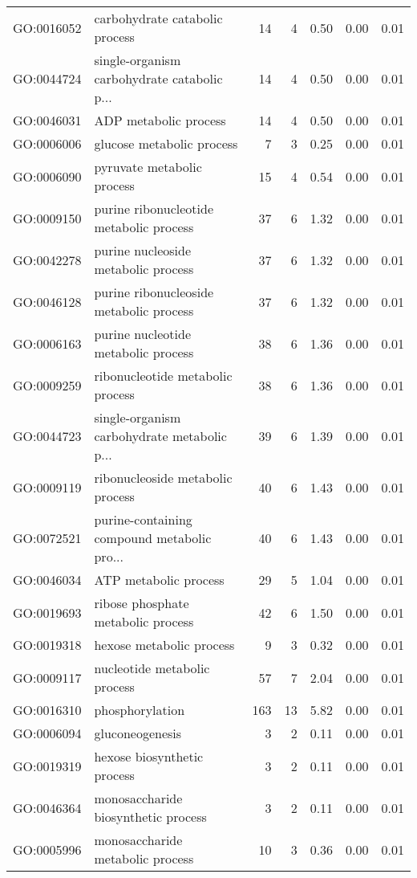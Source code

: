 \begin{table}[ht]
\begin{tabular}{llrrrrr}
  GO:0016052 & carbohydrate catabolic process &  14 &   4 & 0.50 & 0.00 & 0.01 \\ 
  GO:0044724 & single-organism carbohydrate catabolic p... &  14 &   4 & 0.50 & 0.00 & 0.01 \\ 
  GO:0046031 & ADP metabolic process &  14 &   4 & 0.50 & 0.00 & 0.01 \\ 
  GO:0006006 & glucose metabolic process &   7 &   3 & 0.25 & 0.00 & 0.01 \\ 
  GO:0006090 & pyruvate metabolic process &  15 &   4 & 0.54 & 0.00 & 0.01 \\ 
  GO:0009150 & purine ribonucleotide metabolic process &  37 &   6 & 1.32 & 0.00 & 0.01 \\ 
  GO:0042278 & purine nucleoside metabolic process &  37 &   6 & 1.32 & 0.00 & 0.01 \\ 
  GO:0046128 & purine ribonucleoside metabolic process &  37 &   6 & 1.32 & 0.00 & 0.01 \\ 
  GO:0006163 & purine nucleotide metabolic process &  38 &   6 & 1.36 & 0.00 & 0.01 \\ 
  GO:0009259 & ribonucleotide metabolic process &  38 &   6 & 1.36 & 0.00 & 0.01 \\ 
  GO:0044723 & single-organism carbohydrate metabolic p... &  39 &   6 & 1.39 & 0.00 & 0.01 \\ 
  GO:0009119 & ribonucleoside metabolic process &  40 &   6 & 1.43 & 0.00 & 0.01 \\ 
  GO:0072521 & purine-containing compound metabolic pro... &  40 &   6 & 1.43 & 0.00 & 0.01 \\ 
  GO:0046034 & ATP metabolic process &  29 &   5 & 1.04 & 0.00 & 0.01 \\ 
  GO:0019693 & ribose phosphate metabolic process &  42 &   6 & 1.50 & 0.00 & 0.01 \\ 
  GO:0019318 & hexose metabolic process &   9 &   3 & 0.32 & 0.00 & 0.01 \\ 
  GO:0009117 & nucleotide metabolic process &  57 &   7 & 2.04 & 0.00 & 0.01 \\ 
  GO:0016310 & phosphorylation & 163 &  13 & 5.82 & 0.00 & 0.01 \\ 
  GO:0006094 & gluconeogenesis &   3 &   2 & 0.11 & 0.00 & 0.01 \\ 
  GO:0019319 & hexose biosynthetic process &   3 &   2 & 0.11 & 0.00 & 0.01 \\ 
  GO:0046364 & monosaccharide biosynthetic process &   3 &   2 & 0.11 & 0.00 & 0.01 \\ 
  GO:0005996 & monosaccharide metabolic process &  10 &   3 & 0.36 & 0.00 & 0.01 \\ 

\end{tabular}
\end{table}
